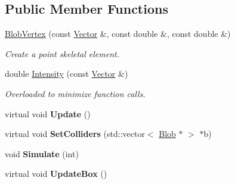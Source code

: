 \subsection*{Public Member Functions}
\begin{DoxyCompactItemize}
\item 
\hyperlink{class_blob_vertex_a25002920035388fcf4b484bcea120662}{BlobVertex} (const \hyperlink{class_vector}{Vector} \&, const double \&, const double \&)
\begin{DoxyCompactList}\small\item\em Create a point skeletal element. \item\end{DoxyCompactList}\item 
\hypertarget{class_blob_vertex_a9bcd5a3956c45ce08586735204148044}{
double \hyperlink{class_blob_vertex_a9bcd5a3956c45ce08586735204148044}{Intensity} (const \hyperlink{class_vector}{Vector} \&)}
\label{class_blob_vertex_a9bcd5a3956c45ce08586735204148044}

\begin{DoxyCompactList}\small\item\em Overloaded to minimize function calls. \item\end{DoxyCompactList}\item 
\hypertarget{class_blob_vertex_a59e20ffd92bd5d3f57911d365e98208b}{
virtual void {\bfseries Update} ()}
\label{class_blob_vertex_a59e20ffd92bd5d3f57911d365e98208b}

\item 
\hypertarget{class_blob_vertex_a2a3f078529cf304286d4c5c71c8ec455}{
virtual void {\bfseries SetColliders} (std::vector$<$ \hyperlink{class_blob}{Blob} $\ast$ $>$ $\ast$b)}
\label{class_blob_vertex_a2a3f078529cf304286d4c5c71c8ec455}

\item 
\hypertarget{class_blob_vertex_a538e272f30184e0c6d5a4cad397cd2fd}{
void {\bfseries Simulate} (int)}
\label{class_blob_vertex_a538e272f30184e0c6d5a4cad397cd2fd}

\item 
\hypertarget{class_blob_vertex_a5a76b45262f2ee0556875e20f29724da}{
virtual void {\bfseries UpdateBox} ()}
\label{class_blob_vertex_a5a76b45262f2ee0556875e20f29724da}

\end{DoxyCompactItemize}
